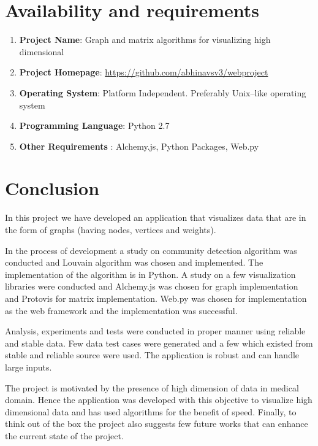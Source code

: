 \section{Availability and requirements}
\begin{enumerate}
\item \textbf{Project Name}: Graph and matrix algorithms for visualizing high dimensional
\item \textbf{Project Homepage}: \url{https://github.com/abhinavsv3/webproject}
\item \textbf{Operating System}: Platform Independent. Preferably Unix--like operating system
\item \textbf{Programming Language}: Python 2.7
\item \textbf{Other Requirements} : Alchemy.js, Python Packages, Web.py
\end{enumerate}

\section{Conclusion}
In this project we have developed an application that visualizes data that are in the form of graphs (having nodes, vertices and weights). 
\par In the process of development a study on community detection algorithm was conducted and Louvain algorithm was chosen and implemented. The implementation of the algorithm is in Python. A study on a few visualization libraries were conducted and Alchemy.js was chosen for graph implementation and Protovis for matrix implementation.  Web.py was chosen for implementation as the web framework and the implementation was successful.
\par Analysis, experiments and tests were conducted in proper manner using reliable and stable data. Few data test cases were generated and a few which existed from stable and reliable source were used. The application is robust and can handle large inputs.
\par The project is motivated by the presence of high dimension of data in medical domain. Hence the application was developed with this objective to visualize high dimensional data and has used algorithms for the benefit of speed. Finally, to think out of the box the project also suggests few future works that can enhance the current state of the project.

